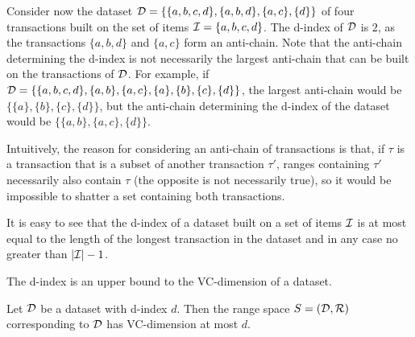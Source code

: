 Consider now the dataset ${\cal D}=\{\{a,b,c,d\},\{a,b,d\},\{a,c\},\{d\}\}$ of four
transactions built on the set of items ${\cal I}=\{a,b,c,d\}$. The d-index of ${\cal D}$ is
$2$, as the transactions $\{a,b,d\}$ and $\{a,c\}$ form an anti-chain.
Note that the anti-chain determining the d-index 
is not necessarily the largest anti-chain that can be built on the transactions of
${\cal D}$. For example, if
${\cal D}=\{\{a,b,c,d\},\{a,b\},\{a,c\},\{a\},\{b\},\{c\},\{d\}\}$, the largest
anti-chain would be $\{\{a\},\{b\},\{c\},\{d\}\}$, but the anti-chain
determining the d-index of the dataset 
would be $\{\{a,b\},\{a,c\},\{d\}\}$.

Intuitively, the reason for considering an anti-chain of transactions is  
that, if $\tau$ is a transaction  that is a subset of another transaction
$\tau'$, ranges containing $\tau'$ necessarily also contain $\tau$ (the opposite
is not necessarily true), so it would be impossible to shatter a set containing
both transactions. 


It is easy to see that the d-index of a dataset built on a set of items ${\cal I}$
is at most equal to the length of the longest transaction in the dataset and in
any case no greater than $|{\cal I}|-1$.


The d-index is an upper bound to the VC-dimension of a dataset.

\begin{theorem}\label{lem:vcdimupperb}
  Let ${\cal D}$ be a dataset with d-index $d$. Then the range space $S=({\cal D},\mathcal{R})$
  corresponding to ${\cal D}$ has VC-dimension at most $d$.
\end{theorem}

